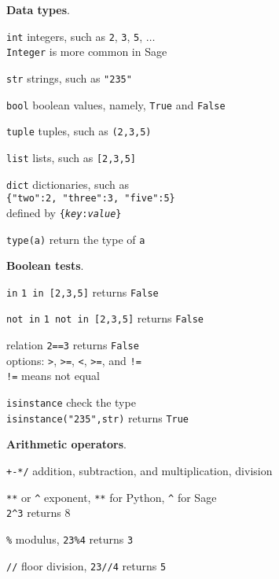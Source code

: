 \documentclass{article}
\newcommand{\heading}[1]{\medskip\textbf{#1}.}
\newenvironment{lwdes}{\begin{description}[leftmargin=1.7cm,align=left,labelwidth=1.5cm]}{\end{description}}
\begin{document}
\begin{multicols}{2}
\heading{Data types}
\begin{lwdes}
\item[\texttt{int}] integers, such as \texttt{2}, \texttt{3}, \texttt{5}, $\ldots$\\
\texttt{Integer} is more common in Sage 
\item[\texttt{str}] strings, such as \texttt{"235"}
\item[\texttt{bool}] boolean values, namely, \texttt{True} and \texttt{False}
\item[\texttt{tuple}] tuples, such as \texttt{(2,3,5)}
\item[\texttt{list}] lists, such as \texttt{[2,3,5]}
\item[\texttt{dict}] dictionaries, such as \\\texttt{\{"two":2, "three":3, "five":5\}} \\defined by \texttt{\{\textit{key}:\textit{value}\}}
\item[\texttt{type(a)}] return the type of \texttt{a}
\end{lwdes}

\heading{Boolean tests}
\begin{lwdes}
\item[\texttt{in}] \texttt{1 in [2,3,5]} returns \texttt{False}
\item[\texttt{not in}] \texttt{1 not in [2,3,5]} returns \texttt{False}
\item[relation] \texttt{2==3} returns \texttt{False}\\
options: \texttt{>}, \texttt{>=}, \texttt{<}, \texttt{>=}, and \texttt{!=}\\
\texttt{!=} means not equal
\item[\texttt{isinstance}] check the type\\
\texttt{isinstance("235",str)} returns \texttt{True}
\end{lwdes}

\heading{Arithmetic operators}
\begin{lwdes}
\item[\texttt{+-*/}] addition, subtraction, and multiplication, division
\item[\texttt{**} or \texttt{\textasciicircum}] exponent, \texttt{**} for Python, \texttt{\textasciicircum} for Sage\\
\texttt{2\textasciicircum3} returns 8
\item[\texttt{\%}] modulus, \texttt{23\%4} returns \texttt{3}
\item[\texttt{\slash\slash}] floor division, \texttt{23\slash\slash4} returns \texttt{5} 
\end{lwdes}
\columnbreak


\end{multicols}
\end{document}
